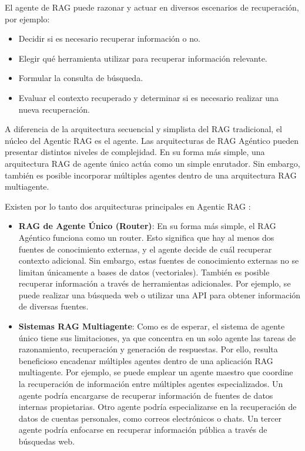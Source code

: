 El agente de RAG puede razonar y actuar en diversos escenarios de recuperación, por ejemplo:

\begin{itemize}
    \item Decidir si es necesario recuperar información o no.
    \item Elegir qué herramienta utilizar para recuperar información relevante.
    \item Formular la consulta de búsqueda.
    \item Evaluar el contexto recuperado y determinar si es necesario realizar una nueva recuperación.
\end{itemize}

A diferencia de la arquitectura secuencial y simplista del RAG tradicional, el núcleo del Agentic RAG es el agente. 
Las arquitecturas de RAG Agéntico pueden presentar distintos niveles de complejidad. 
En su forma más simple, una arquitectura RAG de agente único actúa como un simple enrutador. 
Sin embargo, también es posible incorporar múltiples agentes dentro de una arquitectura RAG multiagente.

Existen por lo tanto dos arquitecturas principales en Agentic RAG \cite{cardenas2024agenticrag}:

\begin{itemize}
    \item \textbf{RAG de Agente Único (Router)}: En su forma más simple, el RAG Agéntico funciona como un router. Esto significa que hay al menos dos fuentes de conocimiento externas, y el agente decide de cuál recuperar contexto adicional.
    Sin embargo, estas fuentes de conocimiento externas no se limitan únicamente a bases de datos (vectoriales). También es posible recuperar información a través de herramientas adicionales. Por ejemplo, se puede realizar una búsqueda web o utilizar una API para obtener información de diversas fuentes.
    \item \textbf{Sistemas RAG Multiagente}: Como es de esperar, el sistema de agente único tiene sus limitaciones, ya que concentra en un solo agente las tareas de razonamiento, recuperación y generación de respuestas. Por ello, resulta beneficioso encadenar múltiples agentes dentro de una aplicación RAG multiagente.
    Por ejemplo, se puede emplear un agente maestro que coordine la recuperación de información entre múltiples agentes especializados. Un agente podría encargarse de recuperar información de fuentes de datos internas propietarias. Otro agente podría especializarse en la recuperación de datos de cuentas personales, como correos electrónicos o chats. Un tercer agente podría enfocarse en recuperar información pública a través de búsquedas web.
\end{itemize}



